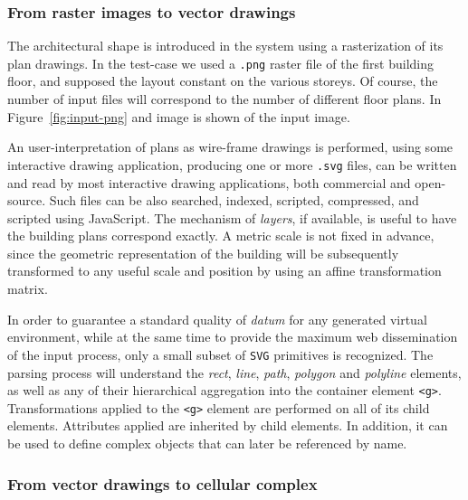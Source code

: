 \documentclass[]{egpubl}
\begin{document}
\subsubsection*{From raster images to vector drawings}

The architectural shape is introduced in the system using a rasterization of its plan drawings.
In the test-case we used a \texttt{.png} raster file of the first building floor, and supposed the layout constant on the various storeys. Of course, the number of input files will correspond to the number of different floor plans. In Figure~\ref{fig:input-png} and image is shown of the input image.

An user-interpretation of plans as wire-frame drawings is performed, using some interactive drawing application, producing one or more \texttt{.svg} files, can be written and read by most
interactive drawing applications, both commercial and open-source. Such
files can be also searched, indexed, scripted, compressed, and scripted  using JavaScript. The mechanism of \emph{layers}, if available, is useful to have the building plans correspond exactly. A metric scale is not fixed in advance, since the geometric representation of the building will be subsequently transformed to any useful scale and position by using an affine transformation matrix.

In order to guarantee a standard quality of \emph{datum} for any generated
virtual environment, while at the same time to provide the maximum web 
dissemination of the input process, only a small subset of
\texttt{SVG} primitives is recognized. The
parsing process will understand the \emph{rect}, \emph{line}, \emph{path}, \emph{polygon} and \emph{polyline} elements, as well as any of
their hierarchical aggregation into the container element
\texttt{\textless{}g\textgreater{}}. Transformations applied to the
\texttt{\textless{}g\textgreater{}} element are performed on all of its
child elements. Attributes applied are inherited by child elements. In
addition, it can be used to define complex objects that can later be
referenced by name.




\subsubsection*{From vector drawings to cellular complex}
\end{document}
